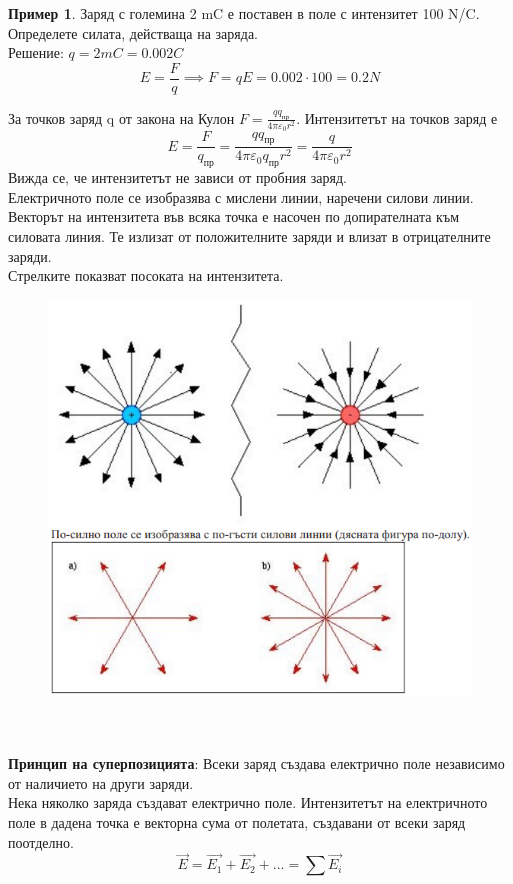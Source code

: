 \documentclass[fleqn, 12pt]{article}
\theoremstyle{definition}
\newtheorem{example}{Пример}[subsection]
\begin{document}
\begin{example}
Заряд с големина 2 mC е поставен в поле с интензитет 100 N/C.
Определете силата, действаща на заряда. \\
Решение: $q = 2mC = 0.002 C$
$$E = \frac{F}{q} \implies F = qE = 0.002 \cdot 100 = 0.2 N$$
\end{example}
За точков заряд q от закона на Кулон $F = \frac{q q_{\text{пр}}}{4 \pi \varepsilon_0 r^2}$. Интензитетът на точков заряд е
$$E = \frac{F}{q_{\text{пр}}} = \frac{q q_{\text{пр}}}{4 \pi \varepsilon_0 q_{\text{пр}} r^2} = \frac{q}{4 \pi \varepsilon_0 r^2}$$
Вижда се, че интензитетът не зависи от пробния заряд.\\
Електричното поле се изобразява с мислени линии, наречени силови линии.
Векторът на интензитета във всяка точка е насочен по допирателната към силовата
линия. Те излизат от положителните заряди и влизат в отрицателните заряди.\\
Стрелките показват посоката на интензитета. 
\begin{figure}[htp!]
  \includegraphics[width = \linewidth]{Pics/physics/lec6-3.png}
\end{figure}
\\
\\
\textbf{Принцип на суперпозицията}: Всеки заряд създава електрично поле независимо
от наличието на други заряди.\\
Нека няколко заряда създават електрично поле. Интензитетът на електричното
поле в дадена точка е векторна сума от полетата, създавани от всеки заряд поотделно. 
$$\vec{E} = \vec{E_1} + \vec{E_2} + ... = \sum \vec{E_i}$$
\end{document}
